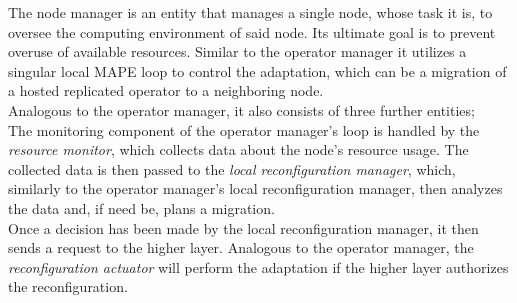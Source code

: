         \quad The node manager is an entity that manages a single node, whose task it is, to oversee the computing environment of said node.
        Its ultimate goal is to prevent overuse of available resources.
        Similar to the operator manager it utilizes a singular local MAPE loop to control the adaptation, 
        which can be a migration of a hosted replicated operator to a neighboring node. 
        \\
        Analogous to the operator manager, it also consists of three further entities;
        \\
        The monitoring component of the operator manager's loop is handled by the \textit{resource monitor}, which collects data about the node's resource usage.
        The collected data is then passed to the \textit{local reconfiguration manager}, which, similarly to the operator manager's local reconfiguration manager, then
        analyzes the data and, if need be, plans a migration. 
        \\
        Once a decision has been made by the local reconfiguration manager, it then sends a request to the higher layer. Analogous to the operator manager, the \textit{reconfiguration actuator} will perform
        the adaptation if the higher layer authorizes the reconfiguration.


